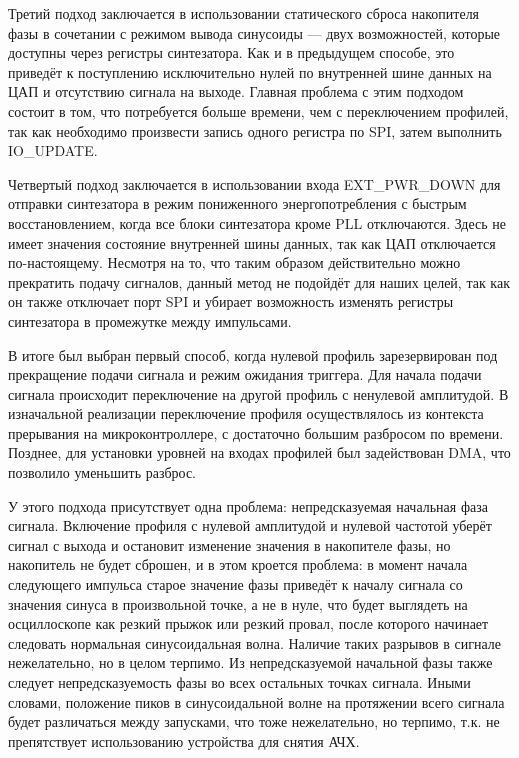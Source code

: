 \documentclass[rusmathsym, eqnumwithinsec, amspack, hyperref]{bomgost}
\begin{document}
Третий подход заключается в использовании статического сброса накопителя фазы в сочетании с режимом вывода синусоиды --- двух возможностей, которые доступны через регистры синтезатора. Как и в предыдущем способе, это приведёт к поступлению исключительно нулей по внутренней шине данных на ЦАП и отсутствию сигнала на выходе. Главная проблема с этим подходом состоит в том, что потребуется больше времени, чем с переключением профилей, так как необходимо произвести запись одного регистра по SPI, затем выполнить IO\_UPDATE.

Четвертый подход заключается в использовании входа EXT\_PWR\_DOWN для отправки синтезатора в режим пониженного энергопотребления с быстрым восстановлением, когда все блоки синтезатора кроме PLL отключаются. Здесь не имеет значения состояние внутренней шины данных, так как ЦАП отключается по-настоящему. Несмотря на то, что таким образом действительно можно прекратить подачу сигналов, данный метод не подойдёт для наших целей, так как он также отключает порт SPI и убирает возможность изменять регистры синтезатора в промежутке между импульсами.

В итоге был выбран первый способ, когда нулевой профиль зарезервирован под прекращение подачи сигнала и режим ожидания триггера. Для начала подачи сигнала происходит переключение на другой профиль с ненулевой амплитудой. В изначальной реализации переключение профиля осуществлялось из контекста прерывания на микроконтроллере, с достаточно большим разбросом по времени. Позднее, для установки уровней на входах профилей был задействован DMA, что позволило уменьшить разброс.

У этого подхода присутствует одна проблема: непредсказуемая начальная фаза сигнала. Включение профиля с нулевой амплитудой и нулевой частотой уберёт сигнал с выхода и остановит изменение значения в накопителе фазы, но накопитель не будет сброшен, и в этом кроется проблема: в момент начала следующего импульса старое значение фазы приведёт к началу сигнала со значения синуса в произвольной точке, а не в нуле, что будет выглядеть на осциллоскопе как резкий прыжок или резкий провал, после которого начинает следовать нормальная синусоидальная волна. Наличие таких разрывов в сигнале нежелательно, но в целом терпимо. Из непредсказуемой начальной фазы также следует непредсказуемость фазы во всех остальных точках сигнала. Иными словами, положение пиков в синусоидальной волне на протяжении всего сигнала будет различаться между запусками, что тоже нежелательно, но терпимо, т.к. не препятствует использованию устройства для снятия АЧХ.
\end{document}
